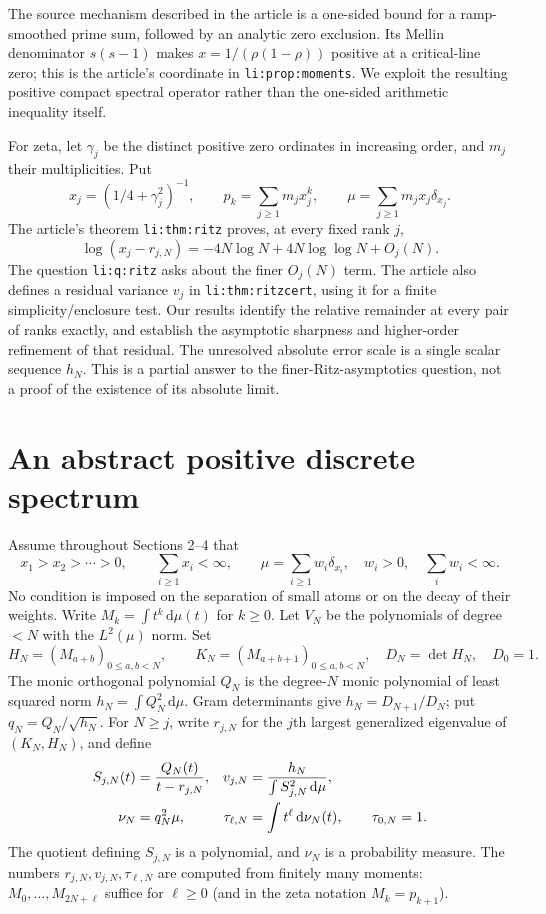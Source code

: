 \documentclass[11pt]{article}
\theoremstyle{remark}\newtheorem{remark}[theorem]{Remark}
\newcommand{\dd}{\,\mathrm d}
\begin{document}
The source mechanism described in the article is a one-sided bound for a ramp-smoothed prime sum, followed by an analytic zero exclusion. Its Mellin denominator $s(s-1)$ makes $x=1/(\rho(1-\rho))$ positive at a critical-line zero; this is the article's coordinate in \texttt{li:prop:moments}. We exploit the resulting positive compact spectral operator rather than the one-sided arithmetic inequality itself.

For zeta, let $\gamma_j$ be the distinct positive zero ordinates in increasing order, and $m_j$ their multiplicities. Put
\begin{equation}\label{eq:zeta-atoms}
 x_j=(1/4+\gamma_j^2)^{-1},\qquad p_k=\sum_{j\ge1}m_jx_j^k,
 \qquad \mu=\sum_{j\ge1}m_jx_j\delta_{x_j}.
\end{equation}
The article's theorem \texttt{li:thm:ritz} proves, at every fixed rank $j$,
\begin{equation}\label{eq:old}
 \log(x_j-r_{j,N})=-4N\log N+4N\log\log N+O_j(N).
\end{equation}
The question \texttt{li:q:ritz} asks about the finer $O_j(N)$ term. The article also defines a residual variance $v_j$ in \texttt{li:thm:ritzcert}, using it for a finite simplicity/enclosure test. Our results identify the relative remainder at every pair of ranks exactly, and establish the asymptotic sharpness and higher-order refinement of that residual. The unresolved absolute error scale is a single scalar sequence $h_N$. This is a partial answer to the finer-Ritz-asymptotics question, not a proof of the existence of its absolute limit.

\section{An abstract positive discrete spectrum}
Assume throughout Sections 2--4 that
\begin{equation}\label{eq:assumptions}
 x_1>x_2>\cdots>0,\qquad \sum_{i\ge1}x_i<\infty,
 \qquad \mu=\sum_{i\ge1}w_i\delta_{x_i},\quad w_i>0,\quad \sum_iw_i<\infty.
\end{equation}
No condition is imposed on the separation of small atoms or on the decay of their weights. Write $M_k=\int t^k\dd\mu(t)$ for $k\ge0$. Let $V_N$ be the polynomials of degree $<N$ with the $L^2(\mu)$ norm. Set
\[
 H_N=(M_{a+b})_{0\le a,b<N},\qquad K_N=(M_{a+b+1})_{0\le a,b<N},\quad D_N=\det H_N,\quad D_0=1.
\]
The monic orthogonal polynomial $Q_N$ is the degree-$N$ monic polynomial of least squared norm $h_N=\int Q_N^2\dd\mu$. Gram determinants give $h_N=D_{N+1}/D_N$; put $q_N=Q_N/\sqrt{h_N}$. For $N\ge j$, write $r_{j,N}$ for the $j$th largest generalized eigenvalue of $(K_N,H_N)$, and define
\begin{align}\label{eq:resid}
 S_{j,N}(t)&=\frac{Q_N(t)}{t-r_{j,N}}, &
 v_{j,N}&=\frac{h_N}{\int S_{j,N}^2\dd\mu},\\
 \nu_N&=q_N^2\mu, & \tau_{\ell,N}&=\int t^\ell\dd\nu_N(t),\qquad \tau_{0,N}=1.\notag
\end{align}
The quotient defining $S_{j,N}$ is a polynomial, and $\nu_N$ is a probability measure. The numbers $r_{j,N},v_{j,N},\tau_{\ell,N}$ are computed from finitely many moments: $M_0,\dots,M_{2N+\ell}$ suffice for $\ell\ge0$ (and in the zeta notation $M_k=p_{k+1}$).
\end{document}
